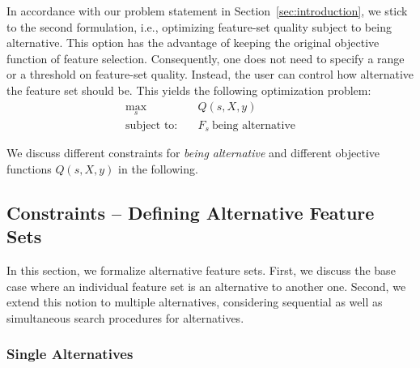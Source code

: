 \documentclass{article}
\theoremstyle{definition}
\begin{document}
In accordance with our problem statement in Section~\ref{sec:introduction}, we stick to the second formulation, i.e., optimizing feature-set quality subject to being alternative.
This option has the advantage of keeping the original objective function of feature selection.
Consequently, one does not need to specify a range or a threshold on feature-set quality.
Instead, the user can control how alternative the feature set should be.
This yields the following optimization problem:
%
\begin{align}
	\max_s &\quad Q(s,X,y) \nonumber \\
	\text{subject to:} &\quad F_s~\text{being alternative}
\end{align}
%

We discuss different constraints for \emph{being alternative} and different objective functions $Q(s,X,y)$ in the following.

\subsection{Constraints -- Defining Alternative Feature Sets}
\label{sec:approach:constraints}

In this section, we formalize alternative feature sets.
First, we discuss the base case where an individual feature set is an alternative to another one.
Second, we extend this notion to multiple alternatives, considering sequential as well as simultaneous search procedures for alternatives.

\subsubsection{Single Alternatives}
\label{sec:approach:constraints:single}
\end{document}
